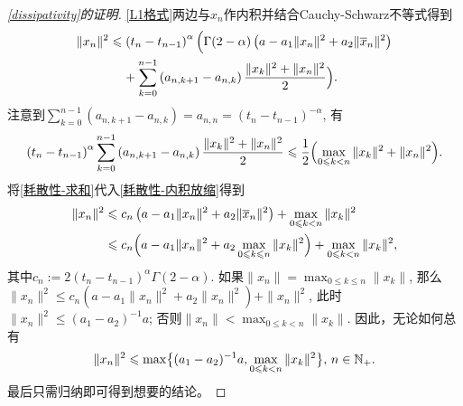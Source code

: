 \begin{proof}[\cref{dissipativity}的证明]
    \cref{L1格式}两边与$x_n$作内积并结合Cauchy-Schwarz不等式得到
    \begin{equation}\label{耗散性-内积放缩}
        \begin{aligned}
            \|x_n\|^2&\leqslant \left(t_n-t_{n-1}\right)^\alpha \Bigl( \Gamma(2-\alpha) \left(a-a_1 \|x_n\|^2 + a_2 \|\overline x_n\|^2\right)
            \\ &\relphantom{\leqslant} + \sum_{k=0}^{n-1} \left(a_{n,k+1}-a_{n,k}\right) \frac{\|x_k\|^2+\|x_n\|^2}{2}\Bigr).
        \end{aligned}
    \end{equation}
    注意到$\sum_{k=0}^{n-1} \left(a_{n,k+1}-a_{n,k}\right)=a_{n,n}=\left(t_n-t_{n-1}\right)^{-\alpha}$, 有
    \begin{equation}\label{耗散性-求和}
        \left(t_n-t_{n-1}\right)^\alpha \sum_{k=0}^{n-1} \left(a_{n,k+1}-a_{n,k}\right) \frac{\|x_k\|^2+\|x_n\|^2}{2}\leqslant\frac{1}{2}\Bigl(\max_{0\leqslant k<n} \|x_k\|^2 + \|x_n\|^2\Bigr).
    \end{equation}
    将\cref{耗散性-求和}代入\cref{耗散性-内积放缩}得到
    \begin{align*}
        \|x_n\|^2 &\leqslant c_n \left(a-a_1 \|x_n\|^2 + a_2 \|\overline x_n\|^2\right) + \max_{0\leqslant k<n} \|x_k\|^2
        \\ &\leqslant c_n \Bigl(a-a_1 \|x_n\|^2 + a_2 \max_{0\leqslant k\leqslant n} \|x_k\|^2\Bigr) + \max_{0\leqslant k<n} \|x_k\|^2,
    \end{align*}
    其中$c_n:=2\left(t_n-t_{n-1}\right)^\alpha \Gamma(2-\alpha)$. 如果$\|x_n\|=\max_{0\leqslant k\leqslant n}\|x_k\|$, 那么$\|x_n\|^2 \leqslant c_n \left(a-a_1 \|x_n\|^2 + a_2 \|x_n\|^2\right) + \|x_n\|^2$, 此时$\|x_n\|^2 \leqslant (a_1-a_2)^{-1}a$; 否则$\|x_n\|<\max_{0\leqslant k<n}\|x_k\|$.
    因此，无论如何总有
    \begin{equation*}
        \|x_n\|^2\leqslant \max\bigl\{(a_1-a_2)^{-1}a,\max_{0\leqslant k<n}\|x_k\|^2\bigr\},\,n\in\mathbb{N_+}.
    \end{equation*}
    最后只需归纳即可得到想要的结论。
\end{proof}

